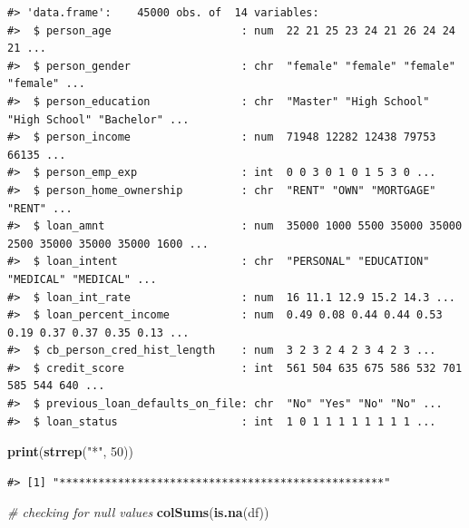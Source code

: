 \documentclass[
  10pt,
]{article}
\newenvironment{Shaded}{\begin{snugshade}}{\end{snugshade}}
\newcommand{\CommentTok}[1]{\textcolor[rgb]{0.56,0.35,0.01}{\textit{#1}}}
\newcommand{\DecValTok}[1]{\textcolor[rgb]{0.00,0.00,0.81}{#1}}
\newcommand{\FunctionTok}[1]{\textcolor[rgb]{0.13,0.29,0.53}{\textbf{#1}}}
\newcommand{\NormalTok}[1]{#1}
\newcommand{\StringTok}[1]{\textcolor[rgb]{0.31,0.60,0.02}{#1}}
\begin{document}
\begin{verbatim}
#> 'data.frame':    45000 obs. of  14 variables:
#>  $ person_age                    : num  22 21 25 23 24 21 26 24 24 21 ...
#>  $ person_gender                 : chr  "female" "female" "female" "female" ...
#>  $ person_education              : chr  "Master" "High School" "High School" "Bachelor" ...
#>  $ person_income                 : num  71948 12282 12438 79753 66135 ...
#>  $ person_emp_exp                : int  0 0 3 0 1 0 1 5 3 0 ...
#>  $ person_home_ownership         : chr  "RENT" "OWN" "MORTGAGE" "RENT" ...
#>  $ loan_amnt                     : num  35000 1000 5500 35000 35000 2500 35000 35000 35000 1600 ...
#>  $ loan_intent                   : chr  "PERSONAL" "EDUCATION" "MEDICAL" "MEDICAL" ...
#>  $ loan_int_rate                 : num  16 11.1 12.9 15.2 14.3 ...
#>  $ loan_percent_income           : num  0.49 0.08 0.44 0.44 0.53 0.19 0.37 0.37 0.35 0.13 ...
#>  $ cb_person_cred_hist_length    : num  3 2 3 2 4 2 3 4 2 3 ...
#>  $ credit_score                  : int  561 504 635 675 586 532 701 585 544 640 ...
#>  $ previous_loan_defaults_on_file: chr  "No" "Yes" "No" "No" ...
#>  $ loan_status                   : int  1 0 1 1 1 1 1 1 1 1 ...
\end{verbatim}

\begin{Shaded}
\begin{Highlighting}[]
\FunctionTok{print}\NormalTok{(}\FunctionTok{strrep}\NormalTok{(}\StringTok{"*"}\NormalTok{, }\DecValTok{50}\NormalTok{))}
\end{Highlighting}
\end{Shaded}

\begin{verbatim}
#> [1] "**************************************************"
\end{verbatim}

\begin{Shaded}
\begin{Highlighting}[]
\CommentTok{\# checking for null values}
\FunctionTok{colSums}\NormalTok{(}\FunctionTok{is.na}\NormalTok{(df))}
\end{Highlighting}
\end{Shaded}
\end{document}
